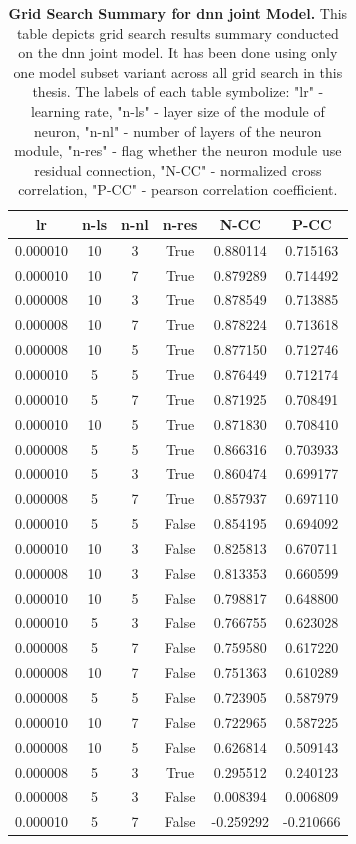 \begin{table}
    \centering\footnotesize\sf
    \begin{tabular}{cccccc}
    \toprule
    lr & n-ls & n-nl & n-res & N-CC & P-CC \\
    \midrule
    0.000010 & 10 & 3 & True & 0.880114 & 0.715163 \\
    0.000010 & 10 & 7 & True & 0.879289 & 0.714492 \\
    0.000008 & 10 & 3 & True & 0.878549 & 0.713885 \\
    0.000008 & 10 & 7 & True & 0.878224 & 0.713618 \\
    0.000008 & 10 & 5 & True & 0.877150 & 0.712746 \\
    0.000010 & 5 & 5 & True & 0.876449 & 0.712174 \\
    0.000010 & 5 & 7 & True & 0.871925 & 0.708491 \\
    0.000010 & 10 & 5 & True & 0.871830 & 0.708410 \\
    0.000008 & 5 & 5 & True & 0.866316 & 0.703933 \\
    0.000010 & 5 & 3 & True & 0.860474 & 0.699177 \\
    0.000008 & 5 & 7 & True & 0.857937 & 0.697110 \\
    0.000010 & 5 & 5 & False & 0.854195 & 0.694092 \\
    0.000010 & 10 & 3 & False & 0.825813 & 0.670711 \\
    0.000008 & 10 & 3 & False & 0.813353 & 0.660599 \\
    0.000010 & 10 & 5 & False & 0.798817 & 0.648800 \\
    0.000010 & 5 & 3 & False & 0.766755 & 0.623028 \\
    0.000008 & 5 & 7 & False & 0.759580 & 0.617220 \\
    0.000008 & 10 & 7 & False & 0.751363 & 0.610289 \\
    0.000008 & 5 & 5 & False & 0.723905 & 0.587979 \\
    0.000010 & 10 & 7 & False & 0.722965 & 0.587225 \\
    0.000008 & 10 & 5 & False & 0.626814 & 0.509143 \\
    0.000008 & 5 & 3 & True & 0.295512 & 0.240123 \\
    0.000008 & 5 & 3 & False & 0.008394 & 0.006809 \\
    0.000010 & 5 & 7 & False & -0.259292 & -0.210666 \\
    \bottomrule
    \end{tabular}
    \caption{\textbf{Grid Search Summary for dnn joint Model.} This table depicts grid search results summary conducted on the dnn joint model. It has been done using only one model subset variant across all grid search in this thesis. The labels of each table symbolize: "lr" - learning rate, "n-ls" - layer size of the module of neuron, "n-nl" - number of layers of the neuron module, "n-res" - flag whether the neuron module use residual connection, "N-CC" - normalized cross correlation, "P-CC" - pearson correlation coefficient.}
    \label{tab:grid_dnn_joint}
\end{table}


